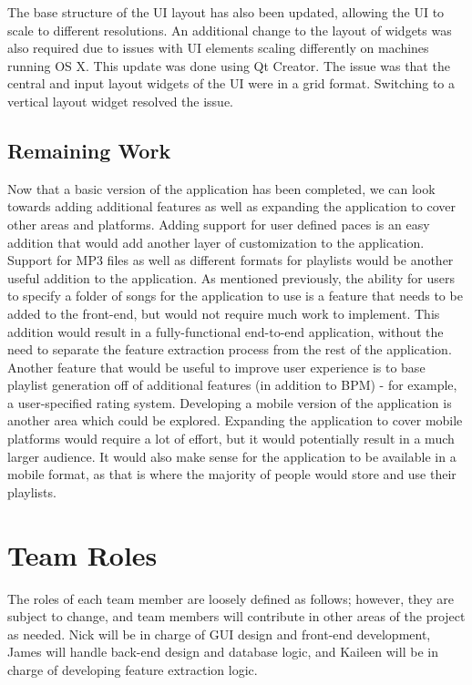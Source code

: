 \documentclass{article}
\begin{document}
The base structure of the UI layout has also been updated, allowing the UI to scale to different resolutions. An additional change to the layout of widgets was also required due to issues with UI elements scaling differently on machines running OS X. This update was done using Qt Creator. The issue was that the central and input layout widgets of the UI were in a grid format. Switching to a vertical layout widget resolved the issue.

\subsection{Remaining Work}
Now that a basic version of the application has been completed, we can look towards adding additional features as well as expanding the application to cover other areas and platforms. Adding support for user defined paces is an easy addition that would add another layer of customization to the application. Support for MP3 files as well as different formats for playlists would be another useful addition to the application. As mentioned previously, the ability for users to specify a folder of songs for the application to use is a feature that needs to be added to the front-end, but would not require much work to implement. This addition would result in a fully-functional end-to-end application, without the need to separate the feature extraction process from the rest of the application. Another feature that would be useful to improve user experience is to base playlist generation off of additional features (in addition to BPM) - for example, a user-specified rating system. Developing a mobile version of the application is another area which could be explored. Expanding the application to cover mobile platforms would require a lot of effort, but it would potentially result in a much larger audience. It would also make sense for the application to be available in a mobile format, as that is where the majority of people would store and use their playlists.

\section{Team Roles}
The roles of each team member are loosely defined as follows; however, they are subject to change, and team members will contribute in other areas of the project as needed. Nick will be in charge of GUI design and front-end development, James will handle back-end design and database logic, and Kaileen will be in charge of developing feature extraction logic.
\end{document}
